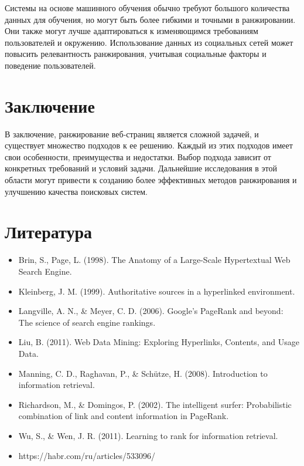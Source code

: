 \documentclass[a4paper]{article}
\begin{document}
	Системы на основе машинного обучения обычно требуют большого количества данных для обучения, но могут быть более гибкими и точными в ранжировании. Они также могут лучше адаптироваться к изменяющимся требованиям пользователей и окружению. Использование данных из социальных сетей может повысить релевантность ранжирования, учитывая социальные факторы и поведение пользователей.
	
	\section{Заключение}
	
	В заключение, ранжирование веб-страниц является сложной задачей, и существует множество подходов к ее решению. Каждый из этих подходов имеет свои особенности, преимущества и недостатки. Выбор подхода зависит от конкретных требований и условий задачи. Дальнейшие исследования в этой области могут привести к созданию более эффективных методов ранжирования и улучшению качества поисковых систем.

\section{Литература}	
\begin{itemize}
	\item Brin, S., Page, L. (1998). The Anatomy of a Large-Scale Hypertextual Web Search Engine.
	\item Kleinberg, J. M. (1999). Authoritative sources in a hyperlinked environment.
	\item Langville, A. N., \& Meyer, C. D. (2006). Google's PageRank and beyond: The science of search engine rankings.
	\item Liu, B. (2011). Web Data Mining: Exploring Hyperlinks, Contents, and Usage Data.
	\item Manning, C. D., Raghavan, P., \& Schütze, H. (2008). Introduction to information retrieval.
	\item Richardson, M., \& Domingos, P. (2002). The intelligent surfer: Probabilistic combination of link and content information in PageRank.
	\item Wu, S., \& Wen, J. R. (2011). Learning to rank for information retrieval.
	\item https://habr.com/ru/articles/533096/
\end{itemize}
	
	
\end{document}

